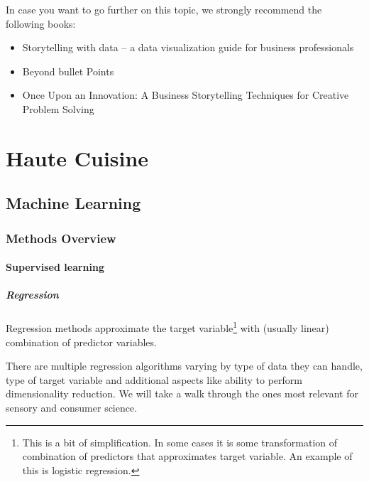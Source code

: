 \documentclass[
]{book}
\begin{document}
In case you want to go further on this topic, we strongly recommend the following books:

\begin{itemize}
\item
  Storytelling with data -- a data visualization guide for business professionals
\item
  Beyond bullet Points
\item
  Once Upon an Innovation: A Business Storytelling Techniques for Creative Problem Solving
\end{itemize}

\hypertarget{part-haute-cuisine}{%
\part*{Haute Cuisine}\label{part-haute-cuisine}}

\hypertarget{machine-learning}{%
\chapter{Machine Learning}\label{machine-learning}}

\hypertarget{methods-overview}{%
\section{Methods Overview}\label{methods-overview}}

\hypertarget{supervised-learning}{%
\subsection{Supervised learning}\label{supervised-learning}}

\hypertarget{regression}{%
\subsubsection{Regression}\label{regression}}

Regression methods approximate the target variable\footnote{This is a bit of simplification.
  In some cases it is some transformation of combination of predictors that
  approximates target variable. An example of this is logistic regression.}
with (usually linear) combination of predictor variables.

There are multiple regression algorithms varying by type of data they can handle,
type of target variable and additional aspects like ability to perform
dimensionality reduction. We will take a walk through the ones most relevant for
sensory and consumer science.
\end{document}
